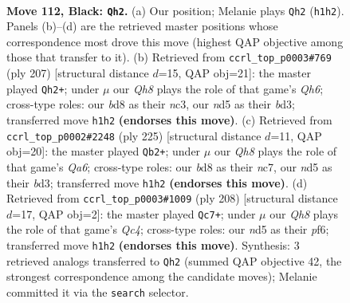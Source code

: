 \documentclass[11pt]{article}
\begin{document}
\clearpage

\begin{figure}[p]\centering
\begin{subfigure}{0.46\textwidth}\centering
\resizebox{\linewidth}{!}{%
\newchessgame
\chessboard[
  setfen={3B4/1k6/8/1K1N2R1/8/8/8/7q b - - 1 112},
  showmover=false,
  pgfstyle=straightmove, color=movearrow, markmove={h1-h2}
]}
\caption{}
\end{subfigure}\hfill
\begin{subfigure}{0.46\textwidth}\centering
\resizebox{\linewidth}{!}{%
\newchessgame
\chessboard[
  setfen={8/8/1k6/8/4R3/2NB3q/3K4/8 b - - 8 104},
  showmover=false,
  pgfstyle=straightmove, color=movearrow, markmove={h3-h2}
]}
\caption{}
\end{subfigure}
\\[4pt]
\begin{subfigure}{0.46\textwidth}\centering
\resizebox{\linewidth}{!}{%
\newchessgame
\chessboard[
  setfen={8/1KN5/5k2/3R4/8/q2B4/8/8 b - - 24 113},
  showmover=false,
  pgfstyle=straightmove, color=movearrow, markmove={a3-b2}
]}
\caption{}
\end{subfigure}\hfill
\begin{subfigure}{0.46\textwidth}\centering
\resizebox{\linewidth}{!}{%
\newchessgame
\chessboard[
  setfen={8/4k3/5p2/6r1/2Q5/4b3/8/7K w - - 13 105},
  showmover=false,
  pgfstyle=straightmove, color=movearrow, markmove={c4-c7}
]}
\caption{}
\end{subfigure}
\caption{\textbf{Move 112, Black: \texttt{Qh2}.} (a) Our position; Melanie plays \texttt{Qh2} (\texttt{h1h2}). Panels (b)--(d) are the retrieved master positions whose correspondence most drove this move (highest QAP objective among those that transfer to it). (b) Retrieved from \texttt{ccrl\_top\_p0003\#769} (ply 207) [structural distance $d$=15, QAP obj=21]: the master played \texttt{Qh2+}; under $\mu$ our \emph{Qh8} plays the role of that game's \emph{Qh6}; cross-type roles: our \emph{b}d8 as their \emph{n}c3, our \emph{n}d5 as their \emph{b}d3; transferred move \texttt{h1h2} \textbf{(endorses this move)}. (c) Retrieved from \texttt{ccrl\_top\_p0002\#2248} (ply 225) [structural distance $d$=11, QAP obj=20]: the master played \texttt{Qb2+}; under $\mu$ our \emph{Qh8} plays the role of that game's \emph{Qa6}; cross-type roles: our \emph{b}d8 as their \emph{n}c7, our \emph{n}d5 as their \emph{b}d3; transferred move \texttt{h1h2} \textbf{(endorses this move)}. (d) Retrieved from \texttt{ccrl\_top\_p0003\#1009} (ply 208) [structural distance $d$=17, QAP obj=2]: the master played \texttt{Qc7+}; under $\mu$ our \emph{Qh8} plays the role of that game's \emph{Qc4}; cross-type roles: our \emph{n}d5 as their \emph{p}f6; transferred move \texttt{h1h2} \textbf{(endorses this move)}. Synthesis: 3 retrieved analogs transferred to \texttt{Qh2} (summed QAP objective 42, the strongest correspondence among the candidate moves); Melanie committed it via the \texttt{search} selector.}
\label{fig:thought-m223}
\end{figure}
\end{document}
